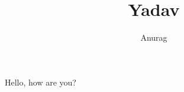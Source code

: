 \documentclass[10pt,a4paper]{report}
\author{Anurag }
\title{Yadav}
\begin{document}
Hello, how are you? 
\end{document}
